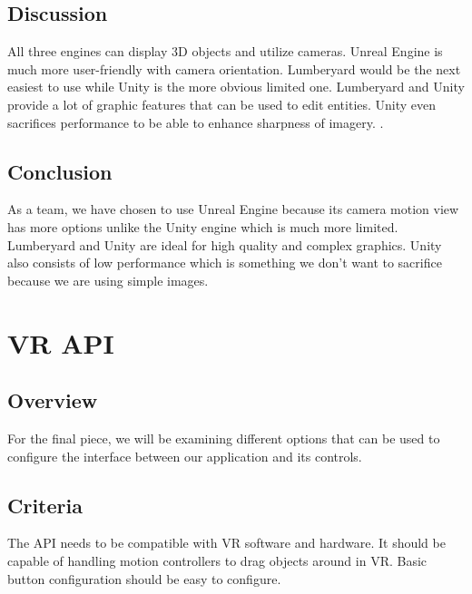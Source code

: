\documentclass[onecolumn, draftclsnofoot, 10pt, compsoc]{IEEEtran}
\begin{document}
\subsection{Discussion}
\begin{singlespace}
All three engines can display 3D objects and utilize cameras. Unreal Engine is much more user-friendly with camera orientation. Lumberyard would be the next easiest to use while Unity is the more obvious limited one. Lumberyard and Unity provide a lot of graphic features that can be used to edit entities. Unity even sacrifices performance to be able to enhance sharpness of imagery. . 
\end{singlespace}

\subsection{Conclusion}
\begin{singlespace}
As a team, we have chosen to use Unreal Engine because its camera motion view has more options unlike the Unity engine which is much more limited. Lumberyard and Unity are ideal for high quality and complex graphics. Unity also consists of low performance which is something we don’t want to sacrifice because we are using simple images.  
\end{singlespace}

\section{VR API}
\subsection{Overview}
\begin{singlespace}
For the final piece, we will be examining different options that can be used to configure the interface between our application and its controls.  
\end{singlespace}

\subsection{Criteria}
\begin{singlespace}
The API needs to be compatible with VR software and hardware. It should be capable of handling motion controllers to drag objects around in VR. Basic button configuration should be easy to configure.   
\end{singlespace}
\end{document}
